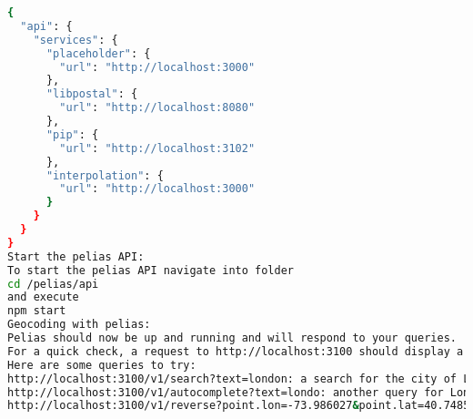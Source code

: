 \begin{lstlisting}[language=bash,breaklines=true]
{
  "api": {
    "services": {
      "placeholder": {
        "url": "http://localhost:3000"
      },
      "libpostal": {
        "url": "http://localhost:8080"
      },
      "pip": {
        "url": "http://localhost:3102"
      },
      "interpolation": {
        "url": "http://localhost:3000"
      }
    }
  }
}
Start the pelias API:
To start the pelias API navigate into folder
cd /pelias/api
and execute
npm start
Geocoding with pelias:
Pelias should now be up and running and will respond to your queries.
For a quick check, a request to http://localhost:3100 should display a link to the documentation for handy reference.
Here are some queries to try:
http://localhost:3100/v1/search?text=london: a search for the city of London.
http://localhost:3100/v1/autocomplete?text=londo: another query for London, but using the autocomplete endpoint which supports partial matches and is intended to be sent queries as a user types (note the query is for londo but London is returned)
http://localhost:3100/v1/reverse?point.lon=-73.986027&point.lat=40.748517: a reverse geocode for results near the Empire State Building in New York City.
\end{lstlisting}